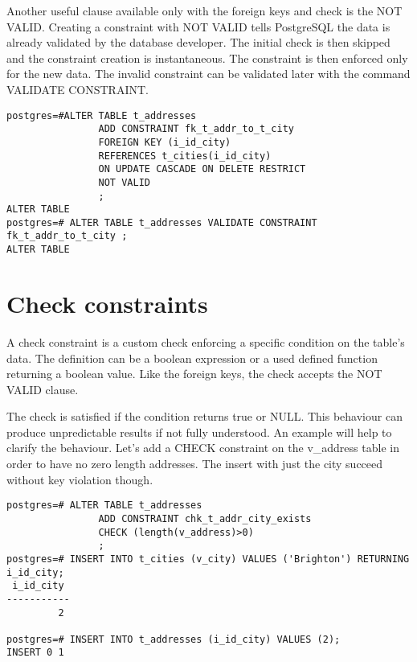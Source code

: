 Another useful clause available only with the foreign keys and check is the NOT VALID. Creating a constraint with NOT VALID tells PostgreSQL the data is already
validated by the database developer. The initial check is then skipped and the constraint creation is
instantaneous. The constraint is then
enforced only for the new data. The invalid constraint can be validated later with the command VALIDATE
CONSTRAINT.

\begin{lstlisting}[style=pgsql]
postgres=#ALTER TABLE t_addresses
                ADD CONSTRAINT fk_t_addr_to_t_city
                FOREIGN KEY (i_id_city)
                REFERENCES t_cities(i_id_city)
                ON UPDATE CASCADE ON DELETE RESTRICT
                NOT VALID
                ;
ALTER TABLE
postgres=# ALTER TABLE t_addresses VALIDATE CONSTRAINT fk_t_addr_to_t_city ;
ALTER TABLE

\end{lstlisting}



\section{Check constraints}
\label{sec:CHECKCNS}

A check constraint is a custom check enforcing a specific condition on the table's data.  The definition
can be a boolean expression or a used defined function returning a boolean value. Like the foreign
keys, the check accepts the NOT VALID clause.\newline

The check is satisfied if the condition returns true or NULL. This behaviour can produce unpredictable
results if not fully understood. An example will help to clarify the behaviour. Let's add
a CHECK constraint on the v\_address table in order to have no zero length addresses. The insert with
just the city succeed without key violation though.

\begin{lstlisting}[style=pgsql]
postgres=# ALTER TABLE t_addresses
                ADD CONSTRAINT chk_t_addr_city_exists
                CHECK (length(v_address)>0)
                ;
postgres=# INSERT INTO t_cities (v_city) VALUES ('Brighton') RETURNING i_id_city;
 i_id_city
-----------
         2

postgres=# INSERT INTO t_addresses (i_id_city) VALUES (2);
INSERT 0 1
\end{lstlisting}


